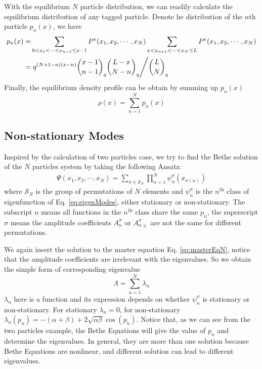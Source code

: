 \documentclass[12pt,a4paper]{article}
\begin{document}
With the equilibrium $N$ particle distribution, we can readily calculate the
equilibrium distribution of any tagged particle. Denote he distribution of the
$n$th particle $p_n(x)$, we have
\begin{equation}
    \begin{aligned}
        \label{eq:pdfTaggedParticle}
        p_n(x) = & \sum_{0<x_1<\cdots<x_{n-1}\le x-1}P^e(x_1, x_2, \cdots, x_N)
        \sum_{x<x_{n+1}<\cdots<x_{N}\le L}P^e(x_1, x_2, \cdots, x_N) \\
        = & \left. q^{(N+1-n)(x-n)} \binom{x-1}{n-1}_q\binom{L-x}{N-n}_q 
            \middle/  \binom{L}{N}_q \right.
    \end{aligned}
\end{equation}
Finally, the equilibrium density profile can be obtain by summing up $p_n(x)$
\begin{equation}
    \label{eq:densityProfile}
    \rho(x) = \sum_{n=1}^N p_n(x) 
\end{equation}


\subsection{Non-stationary Modes}
\label{sub:non_stationary_modes}

Inspired by the calculation of two particles case, we try to find the Bethe
solution of the $N$ particles system by taking the following Ansatz: 
\begin{equation}
    \label{eq:nonstationaryModesN}
    \begin{aligned}
        \Psi(x_1, x_2, \cdots, x_N) = \sum_{\sigma\in \mathcal{S}_N}
        \prod_{n=1}^N \psi_n^{\sigma}(x_{\sigma(n)})
    \end{aligned}
\end{equation}
where $\mathcal{S}_N$ is the group of permutations of $N$ elements and
$\psi_n^{\sigma}$ is the $n^{\text{th}}$ class of eigenfunction of Eq.
\eqref{eq:eigenModes}, either stationary or non-stationary. The subscript $n$
means all functions in the $n^{\text{th}}$ class share the same $p_n$, the
superscript $\sigma$ means the amplitude coefficients $A_n^{\sigma}$ or
$A_{n\pm}^{\sigma}$ are not the same for different permutations.

We again insert the solution to the master equation Eq. \eqref{eq:masterEqN},
notice that the amplitude coefficients are irrelevant with the eigenvalues. So
we obtain the simple form of corresponding eigenvalue 
\begin{equation}
    \label{eq:eigenvaluesN}
    \Lambda = \sum_{n=1}^N \lambda_n
\end{equation}
$\lambda_n$ here is a function and its expression depends on whether
$\psi_n^{\sigma}$ is stationary or non-stationary. For stationary $\lambda_n=0$,
for non-stationary $\lambda_n(p_n)=
-(\alpha+\beta)+2\sqrt{\alpha\beta}\cos(p_n)$.  Notice that, as we can see from
the two particles example, the Bethe Equations will give the value of $p_n$ and
determine the eigenvalues. In general, they are more than one solution because
Bethe Equations are nonlinear, and different solution can lead to different
eigenvalues.
\end{document}
